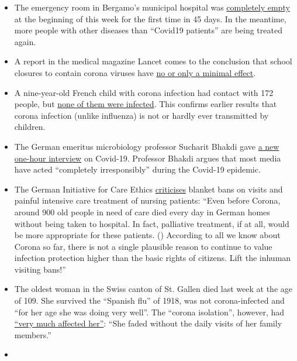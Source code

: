 \begin{itemize}
\item
  The emergency room in Bergamo's municipal hospital was
  \href{https://orf.at/stories/3162642/}{completely empty} at the
  beginning of this week for the first time in 45 days. In the meantime,
  more people with other diseases than ``Covid19 patients'' are being
  treated again.
\item
  A report in the medical magazine Lancet comes to the conclusion that
  school closures to contain corona viruses have
  \href{https://www.thelancet.com/journals/lanchi/article/PIIS2352-4642(20)30095-X/fulltext}{no
  or only a minimal effect}.
\item
  A nine-year-old French child with corona infection had contact with
  172 people, but
  \href{https://www.n-tv.de/panorama/172-Kontaktpersonen-von-Corona-verschont-article21727469.html}{none
  of them were infected}. This confirms earlier results that corona
  infection (unlike influenza) is not or hardly ever transmitted by
  children.
\item
  The German emeritus microbiology professor Sucharit Bhakdi gave
  \href{https://kenfm.de/kenfm-am-set-gespraech-mit-prof-dr-sucharit-bhakdi-zu-covid-19/}{a
  new one-hour interview} on Covid-19. Professor Bhakdi argues that most
  media have acted ``completely irresponsibly'' during the Covid-19
  epidemic.
\item
  The German Initiative for Care Ethics
  \href{http://pflegeethik-initiative.de/2020/04/15/corona-krise-falsche-prioritaeten-gesetzt-und-ethische-prinzipien-verletzt/}{criticises}
  blanket bans on visits and painful intensive care treatment of nursing
  patients: ``Even before Corona, around 900 old people in need of care
  died every day in German homes without being taken to hospital. In
  fact, palliative treatment, if at all, would be more appropriate for
  these patients. () According to all we know about Corona so far, there
  is not a single plausible reason to continue to value infection
  protection higher than the basic rights of citizens. Lift the inhuman
  visiting bans!''
\item
  The oldest woman in the Swiss canton of St. Gallen died last week at
  the age of 109. She survived the ``Spanish flu'' of 1918, was not
  corona-infected and ``for her age she was doing very well''. The
  ``corona isolation'', however, had
  \href{https://swprs.files.wordpress.com/2020/04/tagblatt-109.jpg}{``very
  much affected her''}: ``She faded without the daily visits of her
  family members.''
\item

\end{itemize}

